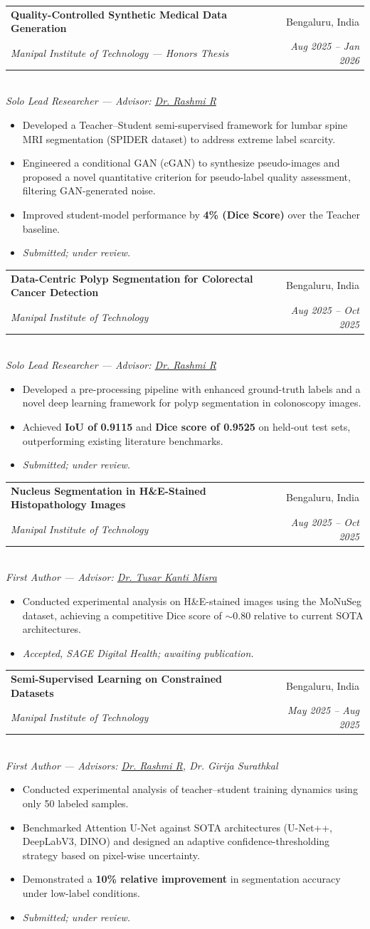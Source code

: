 \documentclass[a4paper,11pt]{article}
\makeatletter
\newcommand{\resumeItem}[1]{
  \item\normalsize{#1}
}
\newcommand{\resumeSubheadingAdv}[5]{
  \needspace{5\baselineskip}
  \vspace{1pt}\item
  \begin{tabular*}{0.97\textwidth}[t]{l@{\extracolsep{\fill}}r}
    \textbf{#1} & #2 \\
    \textit{\small #3} & \textit{\small #4} \\
  \end{tabular*}\\
  \textit{\small #5}\vspace{-4pt}
}
\newcommand{\resumeItemListStart}{\begin{itemize}[leftmargin=0.2in, itemsep=1.5pt, topsep=3pt]}
\newcommand{\resumeItemListEnd}{\end{itemize}\vspace{0pt}}
\makeatother
\begin{document}
\resumeSubheadingAdv
  {Quality-Controlled Synthetic Medical Data Generation}{Bengaluru, India}
  {Manipal Institute of Technology --- Honors Thesis}{Aug 2025 -- Jan 2026}
  {Solo Lead Researcher --- Advisor: \href{https://scholar.google.com/citations?user=HJBNUtUAAAAJ\&hl=en\&oi=ao}{Dr. Rashmi R}}
  \resumeItemListStart
    \resumeItem{Developed a Teacher--Student semi-supervised framework for lumbar spine MRI segmentation (SPIDER dataset) to address extreme label scarcity.}
    \resumeItem{Engineered a conditional GAN (cGAN) to synthesize pseudo-images and proposed a novel quantitative criterion for pseudo-label quality assessment, filtering GAN-generated noise.}
    \resumeItem{Improved student-model performance by \textbf{4\% (Dice Score)} over the Teacher baseline.}
    \resumeItem{\textit{Submitted; under review.}}
  \resumeItemListEnd



\resumeSubheadingAdv
  {Data-Centric Polyp Segmentation for Colorectal Cancer Detection}{Bengaluru, India}
  {Manipal Institute of Technology}{Aug 2025 -- Oct 2025}
  {Solo Lead Researcher --- Advisor: \href{https://scholar.google.com/citations?user=HJBNUtUAAAAJ\&hl=en\&oi=ao}{Dr. Rashmi R}}
  \resumeItemListStart
    \resumeItem{Developed a pre-processing pipeline with enhanced ground-truth labels and a novel deep learning framework for polyp segmentation in colonoscopy images.}
    \resumeItem{Achieved \textbf{IoU of 0.9115} and \textbf{Dice score of 0.9525} on held-out test sets, outperforming existing literature benchmarks.}
    \resumeItem{\textit{Submitted; under review.}}
  \resumeItemListEnd



\resumeSubheadingAdv
  {Nucleus Segmentation in H\&E-Stained Histopathology Images}{Bengaluru, India}
  {Manipal Institute of Technology}{Aug 2025 -- Oct 2025}
  {First Author --- Advisor: \href{https://scholar.google.co.in/citations?hl=en\&user=djknKEYAAAAJ}{Dr. Tusar Kanti Misra}}
  \resumeItemListStart
    \resumeItem{Conducted experimental analysis on H\&E-stained images using the MoNuSeg dataset, achieving a competitive Dice score of $\sim$0.80 relative to current SOTA architectures.}
    \resumeItem{\textit{Accepted, SAGE Digital Health; awaiting publication.}}
  \resumeItemListEnd



\resumeSubheadingAdv
  {Semi-Supervised Learning on Constrained Datasets}{Bengaluru, India}
  {Manipal Institute of Technology}{May 2025 -- Aug 2025}
  {First Author --- Advisors: \href{https://scholar.google.com/citations?user=HJBNUtUAAAAJ\&hl=en\&oi=ao}{Dr. Rashmi R}, Dr. Girija Surathkal}
  \resumeItemListStart
    \resumeItem{Conducted experimental analysis of teacher--student training dynamics using only 50 labeled samples.}
    \resumeItem{Benchmarked Attention U-Net against SOTA architectures (U-Net++, DeepLabV3, DINO) and designed an adaptive confidence-thresholding strategy based on pixel-wise uncertainty.}
    \resumeItem{Demonstrated a \textbf{10\% relative improvement} in segmentation accuracy under low-label conditions.}
    \resumeItem{\textit{Submitted; under review.}}
  \resumeItemListEnd
\end{document}
